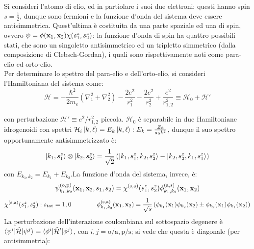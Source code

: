 \begin{example}
	Si consideri l'atomo di elio, ed in partiolare i suoi due elettroni: questi hanno spin $ s = \frac{1}{2} $, dunque sono fermioni e la funzione d'onda del sistema deve essere antisimmetrica. Quest'ultima è costituita da una parte spaziale ed una di spin, ovvero $ \psi = \phi(\mathbf{x}_1, \mathbf{x}_2) \chi(s^z_1, s^z_2) $: la funzione d'onda di spin ha quattro possibili stati, che sono un singoletto antisimmetrico ed un tripletto simmetrico (dalla composizione di Clebsch-Gordan), i quali sono rispettivamente noti come para-elio ed orto-elio.\\
	Per determinare lo spettro del para-elio e dell'orto-elio, si consideri l'Hamiltoniana del sistema come:
	\begin{equation*}
		\mathcal{H} = - \frac{\hbar^2}{2m_e} \left( \nabla_1^2 + \nabla_2^2 \right) - \frac{2e^2}{r_1^2} - \frac{2e^2}{r_2^2} + \frac{e^2}{r_{1,2}^2} \equiv \mathcal{H}_0 + \mathcal{H}'
	\end{equation*}
\end{example}
con perturbazione $ \mathcal{H}' \equiv e^2 / r_{1,2}^2 $ piccola. $ \mathcal{H}_0 $ è separabile in due Hamiltoniane idrogenoidi con spettri $ \mathcal{H}_i \ket{k,\ell} = E_k \ket{k,\ell} : E_k = \frac{Ze}{a_0 k^2} $, dunque il suo spettro opportunamente antisimmetrizzato è:
\begin{equation*}
	\ket{k_1, s_1^z} \otimes \ket{k_2, s_2^z} = \frac{1}{\sqrt{2}} \left( \ket{k_1, s_1^z, k_2, s_2^z} - \ket{k_2, s_2^z, k_1, s_1^z} \right)
\end{equation*}
con $ E_{k_1, k_2} = E_{k_1} + E_{k_2} $.La funzione d'onda del sistema, invece, è:
\begin{equation*}
	\psi^{(\mathrm{o},\mathrm{p})}_{k_1, k_2} (\mathbf{x}_1, \mathbf{x}_2, s_1, s_2) = \chi^{(\mathrm{s},\mathrm{a})}(s_1^z, s_2^z) \phi^{(\mathrm{a},\mathrm{s})}_{k_1, k_2} (\mathbf{x}_1, \mathbf{x}_2)
\end{equation*}
\begin{equation*}
	\chi^{(\mathrm{s},\mathrm{a})}(s^z_1, s^z_2) : s_\mathrm{tot} = 1,0
	\qquad\qquad
	\phi^{(\mathrm{s},\mathrm{a})}_{k_1, k_2} (\mathbf{x}_1, \mathbf{x}_2) = \frac{1}{\sqrt{s}} \left( \phi_{k_1}(\mathbf{x}_1) \phi_{k_2}(\mathbf{x}_2) \pm \phi_{k_2}(\mathbf{x}_1) \phi_{k_1}(\mathbf{x}_2) \right)
\end{equation*}
La perturbazione dell'interazione coulombiana sul sottospazio degenere è $ \braket{\psi^i | \hat{\mathcal{H}} | \psi^j} = \braket{\phi^i | \hat{\mathcal{H}}' | \phi^j} $, con $ i,j = \mathrm{o}/\mathrm{a}, \mathrm{p}/\mathrm{s} $; si vede che questa è diagonale (per antisimmetria):
